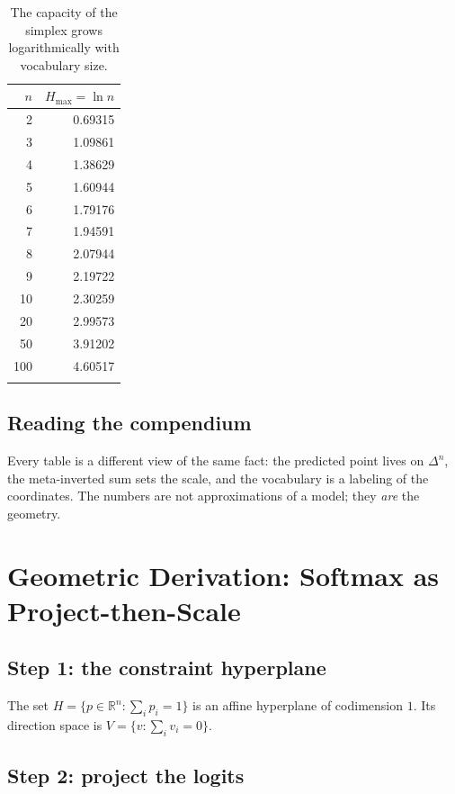 \documentclass[11pt]{article}
\newcommand{\simplex}[1]{\Delta^{#1}}
\newcommand{\RR}{\mathbb{R}}
\begin{document}
\begin{longtable}{@{}rr@{}}
\toprule
$n$ & $H_{\max}=\ln n$ \\
\midrule
2 & 0.69315 \\
3 & 1.09861 \\
4 & 1.38629 \\
5 & 1.60944 \\
6 & 1.79176 \\
7 & 1.94591 \\
8 & 2.07944 \\
9 & 2.19722 \\
10 & 2.30259 \\
20 & 2.99573 \\
50 & 3.91202 \\
100 & 4.60517 \\
\bottomrule
\caption{The capacity of the simplex grows logarithmically with vocabulary size.}
\label{tab:comp-uniform}
\end{longtable}

\subsection{Reading the compendium}
\label{sec:comp-read}

Every table is a different view of the same fact: the predicted point lives on
$\simplex{n}$, the meta-inverted sum sets the scale, and the vocabulary is a
labeling of the coordinates. The numbers are not approximations of a model; they
\emph{are} the geometry.

\section{Geometric Derivation: Softmax as Project-then-Scale}
\label{sec:geometric}

\subsection{Step 1: the constraint hyperplane}
\label{sec:geo-step1}

The set $H = \{p\in\RR^n : \sum_i p_i = 1\}$ is an affine hyperplane of
codimension $1$. Its direction space is $V = \{v : \sum_i v_i = 0\}$.

\subsection{Step 2: project the logits}
\label{sec:geo-step2}
\end{document}
